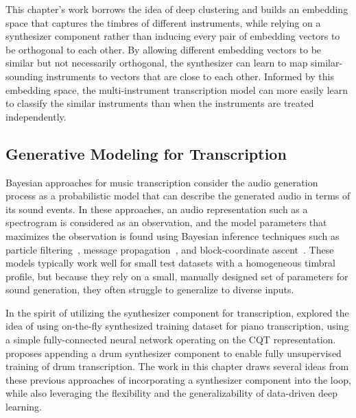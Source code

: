 This chapter's work borrows the idea of deep clustering and builds an embedding space that captures the timbres of different instruments, while relying on a synthesizer component rather than inducing every pair of embedding vectors to be orthogonal to each other.
By allowing different embedding vectors to be similar but not necessarily orthogonal, the synthesizer can learn to map similar-sounding instruments to vectors that are close to each other.
Informed by this embedding space, the multi-instrument transcription model can more easily learn to classify the similar instruments than when the instruments are treated independently.



\subsection{Generative Modeling for Transcription}

Bayesian approaches for music transcription consider the audio generation process as a probabilistic model that can describe the generated audio in terms of its sound events.
In these approaches, an audio representation such as a spectrogram is considered as an observation, and the model parameters that maximizes the observation is found using Bayesian inference techniques such as particle filtering~\cite{dubois2005harmonic}, message propagation~\cite{cemgil2006generative}, and block-coordinate ascent~\cite{bergkirkpatrick2014unsupervised}.
These models typically work well for small test datasets with a homogeneous timbral profile, but because they rely on a small, manually designed set of parameters for sound generation, they often struggle to generalize to diverse inputs.

In the spirit of utilizing the synthesizer component for transcription,
 explored the idea of using on-the-fly synthesized training dataset for piano transcription, using a simple fully-connected neural network operating on the CQT representation.
\cite{choi2019drum} proposes appending a drum synthesizer component to enable fully unsupervised training of drum transcription.
The work in this chapter draws several ideas from these previous approaches of incorporating a synthesizer component into the loop, while also leveraging the flexibility and the generalizability of data-driven deep learning.

